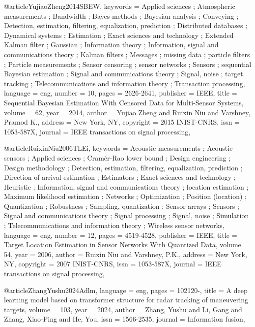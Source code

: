 @article{YujiaoZheng2014SBEW,
keywords = {Applied sciences ; Atmospheric measurements ; Bandwidth ; Bayes methods ; Bayesian analysis ; Conveying ; Detection, estimation, filtering, equalization, prediction ; Distributed databases ; Dynamical systems ; Estimation ; Exact sciences and technology ; Extended Kalman filter ; Gaussian ; Information theory ; Information, signal and communications theory ; Kalman filters ; Messages ; missing data ; particle filters ; Particle measurements ; Sensor censoring ; sensor networks ; Sensors ; sequential Bayesian estimation ; Signal and communications theory ; Signal, noise ; target tracking ; Telecommunications and information theory ; Transaction processing},
language = {eng},
number = {10},
pages = {2626-2641},
publisher = {IEEE},
title = {Sequential Bayesian Estimation With Censored Data for Multi-Sensor Systems},
volume = {62},
year = {2014},
author = {Yujiao Zheng and Ruixin Niu and Varshney, Pramod K.},
address = {New York, NY},
copyright = {2015 INIST-CNRS},
issn = {1053-587X},
journal = {IEEE transactions on signal processing},
}

@article{RuixinNiu2006TLEi,
keywords = {Acoustic measurements ; Acoustic sensors ; Applied sciences ; Cramér-Rao lower bound ; Design engineering ; Design methodology ; Detection, estimation, filtering, equalization, prediction ; Direction of arrival estimation ; Estimators ; Exact sciences and technology ; Heuristic ; Information, signal and communications theory ; location estimation ; Maximum likelihood estimation ; Networks ; Optimization ; Position (location) ; Quantization ; Robustness ; Sampling, quantization ; Sensor arrays ; Sensors ; Signal and communications theory ; Signal processing ; Signal, noise ; Simulation ; Telecommunications and information theory ; Wireless sensor networks},
language = {eng},
number = {12},
pages = {4519-4528},
publisher = {IEEE},
title = {Target Location Estimation in Sensor Networks With Quantized Data},
volume = {54},
year = {2006},
author = {Ruixin Niu and Varshney, P.K.},
address = {New York, NY},
copyright = {2007 INIST-CNRS},
issn = {1053-587X},
journal = {IEEE transactions on signal processing},
}


@article{ZhangYushu2024Adlm,
language = {eng},
pages = {102120-},
title = {A deep learning model based on transformer structure for radar tracking of maneuvering targets},
volume = {103},
year = {2024},
author = {Zhang, Yushu and Li, Gang and Zhang, Xiao-Ping and He, You},
issn = {1566-2535},
journal = {Information fusion},
}

